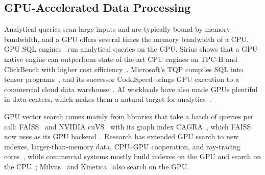 \subsection{GPU-Accelerated Data Processing}\label{subsec:gpu-data-processing}

Analytical queries scan large inputs and are typically bound by memory bandwidth, and a GPU offers several times the memory bandwidth of a CPU\@.
GPU SQL engines~\cite{HeavyDB, Kinetica, AramburuTheseus25} run analytical queries on the GPU.
Sirius shows that a GPU-native engine can outperform state-of-the-art CPU engines on TPC-H and ClickBench with higher cost efficiency~\cite{Yogatama26, SiriusClickBench25}.
Microsoft's TQP compiles SQL into tensor programs~\cite{HeTQP22}, and its successor CoddSpeed brings GPU execution to a commercial cloud data warehouse~\cite{InterlandiCoddSpeed26}.
AI workloads have also made GPUs plentiful in data centers, which makes them a natural target for analytics~\cite{InterlandiCoddSpeed26}.

GPU vector search comes mainly from libraries that take a batch of queries per call: FAISS~\cite{JohnsonFaissGPU21} and NVIDIA cuVS~\cite{NvidiaCuVS26} with its graph index CAGRA~\cite{OotomoCAGRA24}, which FAISS now uses as its GPU backend~\cite{MetaFaissCuVS25}.
Research has extended GPU search to new indexes, larger-than-memory data, CPU--GPU cooperation, and ray-tracing cores~\cite{ZhaoSONG19, GrohGGNN22, KarthikBANG24, ZhangRummy24, TianFusionANNS25, LiuJuno24}, while commercial systems mostly build indexes on the GPU and search on the CPU~\cite{ElasticGPUIndexing, OpenSearchGPU25, SolrCuVS, OracleVectorIndexService}; Milvus~\cite{MilvusGPUIndex} and Kinetica~\cite{KineticaVectorSearch} also search on the GPU.

